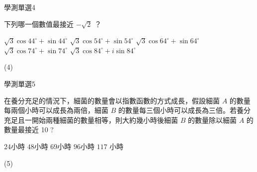     \begin{QUESTION}
        \begin{ExamInfo}{95}{學測}{單選}{4}
        \end{ExamInfo}
        \begin{ExamAnsRateInfo}{34}{67}{23}{12}
        \end{ExamAnsRateInfo}
        \begin{QBODY}
            下列哪一個數值最接近 $-\sqrt{2}$ ？ 
			\begin{QOPS} 
				\QOP $\sqrt{3}\cos{44^\circ}+ \sin{44^\circ}$ 
				\QOP $\sqrt{3}\cos{54^\circ}+ \sin{54^\circ}$ 
				\QOP $\sqrt{3}\cos{64^\circ} +\sin{64^\circ}$
				\QOP $\sqrt{3}\cos{74^\circ}+\sin{74^\circ}$
				\QOP $\sqrt{3}\cos{84^\circ}+i\sin{84^\circ}$
			\end{QOPS}
        \end{QBODY}
        \begin{QFROMS}
        \end{QFROMS}
        \begin{QTAGS}\end{QTAGS}
        \begin{QANS}
            (4)
        \end{QANS}
        \begin{QSOLLIST}
        \end{QSOLLIST}
        \begin{QEMPTYSPACE}
        \end{QEMPTYSPACE}
    \end{QUESTION}
    \begin{QUESTION}
        \begin{ExamInfo}{95}{學測}{單選}{5}
        \end{ExamInfo}
        \begin{ExamAnsRateInfo}{24}{50}{15}{7}
        \end{ExamAnsRateInfo}
        \begin{QBODY}
            在養分充足的情況下，細菌的數量會以指數函數的方式成長，假設細菌 $A$ 的數量每兩個小時可以成長為兩倍，細菌 $B$ 的數量每三個小時可以成長為三倍。若養分充足且一開始兩種細菌的數量相等，則大約幾小時後細菌 $B$ 的數量除以細菌 $A$ 的數量最接近 10 ? 
			\begin{QOPS} 
				\QOP $24 $小時    
				\QOP $48 $小時    
				\QOP $69 $小時 
				\QOP $96 $小時    
				\QOP $117$ 小時
			\end{QOPS}
        \end{QBODY}
        \begin{QFROMS}
        \end{QFROMS}
        \begin{QTAGS}\end{QTAGS}
        \begin{QANS}
            (5)
        \end{QANS}
        \begin{QSOLLIST}
        \end{QSOLLIST}
        \begin{QEMPTYSPACE}
        \end{QEMPTYSPACE}
    \end{QUESTION}
